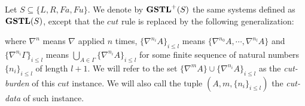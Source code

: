 \begin{dfn}\label{def:n-cut}
	Let $S \subseteq \{L, R, Fa, Fu\}$. We denote by $\mathbf{GSTL}^+(S)$ the same systems defined as $\mathbf{GSTL}(S)$, except that the $cut$ rule is replaced by the following generalization:
	\begin{prooftree}
	\end{prooftree}
	where $\nabla^n$ means $\nabla$ applied $n$ times, $\{\nabla^{n_i} A\}_{i \leq l}$ means $\{\nabla^{n_0} A,\dotsb, \nabla^{n_l} A\}$ and $\{\nabla^{n_i} \Gamma\}_{i \leq l}$ means $\bigcup_{A \in \Gamma} \{\nabla^{n_i} A\}_{i \leq l}$ for some finite sequence of natural numbers $\{n_i\}_{i \leq l}$ of length $l+1$.
	We will refer to the set $\{\nabla^m A\} \cup \{\nabla^{n_i} A\}_{i \leq l}$ as the \emph{cut-burden} of this $cut$ instance. We will also call the tuple $(A, m, \{n_i\}_{i \leq l})$ the \emph{cut-data} of such instance.
\end{dfn}